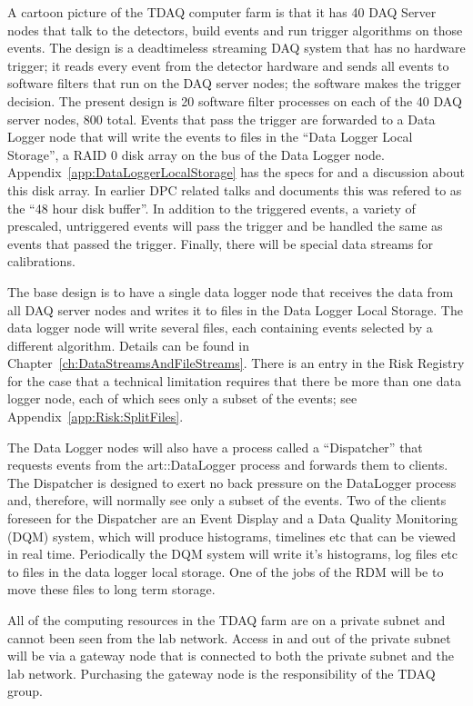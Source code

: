 A cartoon picture of the TDAQ computer farm is that it has 40 DAQ Server nodes
that talk to the detectors, build events and run trigger algorithms on those events.
The design is a deadtimeless streaming DAQ system that has no hardware trigger;
it reads every event from the detector hardware and sends all events to software filters
that run on the DAQ server nodes;
the software makes the trigger decision.
The present design is 20 software filter processes on each of the 40 DAQ server nodes, 800 total.
Events that pass the trigger are forwarded to a Data Logger node that will write the events
to files in the ``Data Logger Local Storage'', a RAID 0 disk array on the bus of the Data Logger node.
Appendix~\ref{app:DataLoggerLocalStorage} has the specs for and a discussion about this disk array.
In earlier DPC related talks and documents this was refered to as the ``48 hour disk buffer''.
In addition to the triggered events, a variety of prescaled, untriggered events will pass the
trigger and be handled the same as events that passed the trigger.
Finally, there will be special data streams for calibrations.

The base design is to have a single data logger node that receives the data from all DAQ server nodes
and writes it to files in the Data Logger Local Storage.
The data logger node will write several files, each containing events selected by a different algorithm.
Details can be found in Chapter~\ref{ch:DataStreamsAndFileStreams}.
There is an entry in the Risk Registry for the case that a technical limitation requires that
there be more than one data logger node, each of which sees only a subset
of the events; see Appendix~\ref{app:Risk:SplitFiles}.

The Data Logger nodes will also have a process called a ``Dispatcher''
that requests events from the {\code art::DataLogger} process
and forwards them to clients.
The Dispatcher is designed to exert no back pressure on the DataLogger process
and, therefore, will normally see only a subset of the events.
Two of the clients foreseen for the Dispatcher are an Event Display and
a Data Quality Monitoring (DQM) system,
which will produce histograms, timelines etc that can be viewed in real time.
Periodically the DQM system will write it's histograms, log files etc to
files in the data logger local storage.  One of the jobs of the RDM will be
to move these files to long term storage.

All of the computing resources in the TDAQ farm are on a private subnet
and cannot been seen from the lab network.  Access in and out
of the private subnet will be via a gateway node that is connected to
both the private subnet and the lab network.
Purchasing the gateway node is the responsibility of the TDAQ group.

